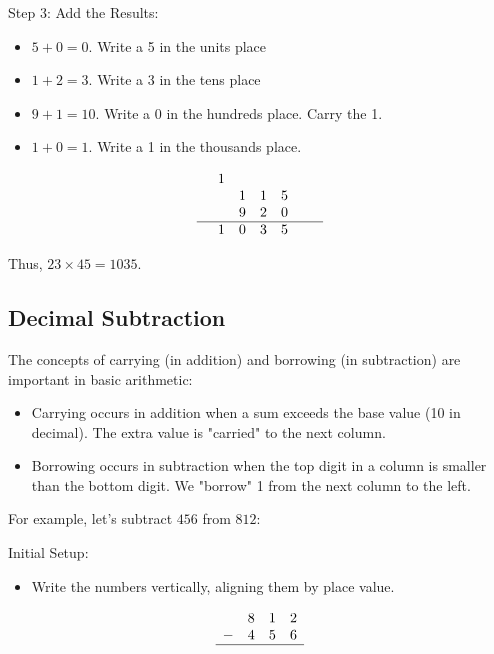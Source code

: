 \vspace{\baselineskip}\par
Step 3: Add the Results:
  \begin{itemize}
  \item \(5 + 0 = 0 \). Write a 5 in the units place
   \item \(1 + 2 = 3\). Write a 3 in the tens place
   \item \(9 + 1 = 10\). Write a 0 in the hundreds place. Carry the 1.
   \item \(1 + 0 = 1\). Write a 1 in the thousands place.
  \end{itemize}
\[
\begin{array}{rcccccc}
        & 1 &  &    &  &  & \\
        &   & 1 & 1 & 5 & & \\ 
        &   & 9 & 2 & 0 &   \\
        \hline
        & 1 & 0  & 3  & 5  &  
\end{array}
\]

Thus, \( 23 \times 45 = 1035 \).



\subsection{Decimal Subtraction}
The concepts of carrying (in addition) and borrowing (in subtraction) are important in basic arithmetic:

\begin{itemize}
    \item Carrying occurs in addition when a sum exceeds the base value (10 in decimal). The extra value is "carried" to the next column.
    \item Borrowing occurs in subtraction when the top digit in a column is smaller than the bottom digit. We "borrow" 1 from the next column to the left.
\end{itemize}

For example, let’s subtract \( 456 \) from \( 812 \):

\vspace{\baselineskip}\par
Initial Setup:
  \begin{itemize}
     \item Write the numbers vertically, aligning them by place value.
     \end{itemize}
\[
\begin{array}{cccc}
    & 8 & 1 & 2 \\
  - & 4 & 5 & 6 \\
  \hline
\end{array}
\]

